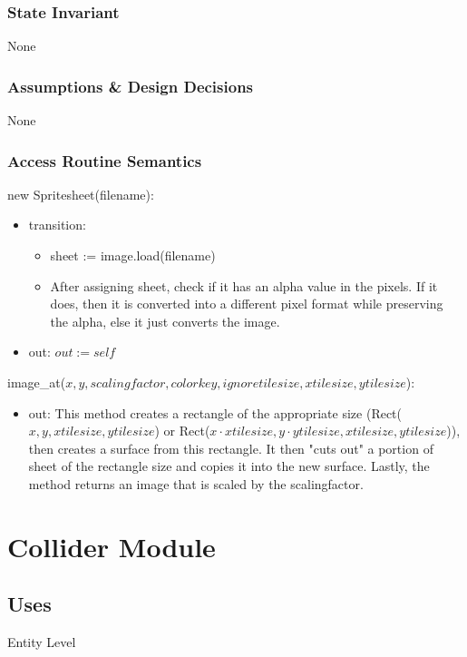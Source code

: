 \documentclass[12pt]{article}
\begin{document}
\subsubsection* {State Invariant}
None

\subsubsection* {Assumptions \& Design Decisions}
None

\subsubsection* {Access Routine Semantics}

new Spritesheet(filename):
\begin{itemize}
\item transition:
    \begin{itemize}[]
        \item sheet := image.load(filename)
        \item After assigning sheet, check if it has an alpha value in the pixels. If it does, then it is converted into a different pixel format while preserving the alpha, else it just converts the image.
    \end{itemize}
\item out: $out := self$
\end{itemize}

\noindent image\_at($x, y, scalingfactor, colorkey, ignoretilesize, xtilesize, ytilesize$):
\begin{itemize}
\item out: This method creates a rectangle of the appropriate size (Rect($x, y, xtilesize, ytilesize$) or Rect($x \cdot xtilesize, y \cdot ytilesize, xtilesize, ytilesize$)), then creates a surface from this rectangle. It then "cuts out" a portion of sheet of the rectangle size and copies it into the new surface. Lastly, the method returns an image that is scaled by the scalingfactor.
\end{itemize}

\newpage

\section* {Collider Module}

\subsection* {Uses}
Entity
Level
\end{document}
